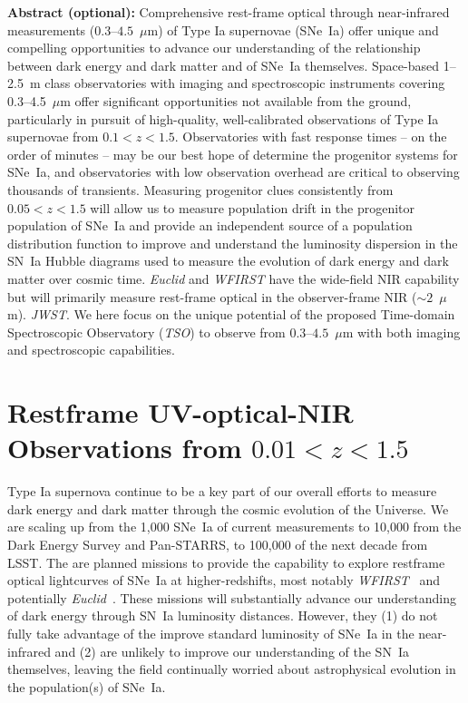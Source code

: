 \documentclass[12pt,preprint]{aastex}
\newcommand{\snia}{SN~Ia\xspace}
\newcommand{\sneia}{SNe~Ia\xspace}
\begin{document}
\textbf{Abstract  (optional):}
    Comprehensive rest-frame optical through near-infrared measurements ($0.3$--$4.5$~$\mu$m) of Type Ia supernovae (\sneia) offer unique and compelling opportunities to advance our understanding of the relationship between dark energy and dark matter and of \sneia themselves.
    Space-based 1--2.5~m class observatories with imaging and spectroscopic instruments covering 0.3--4.5~$\mu$m offer significant opportunities not available from the ground, particularly in pursuit of high-quality, well-calibrated observations of Type Ia supernovae from $0.1<z<1.5$.  Observatories with fast response times -- on the order of minutes -- may be our best hope of determine the progenitor systems for \sneia, and observatories with low observation overhead are critical to observing thousands of transients.  Measuring progenitor clues consistently from $0.05<z<1.5$ will allow us to measure population drift in the progenitor population of \sneia and provide an independent source of a population distribution function to improve and understand the luminosity dispersion in the \snia Hubble diagrams used to measure the evolution of dark energy and dark matter over cosmic time.  {\it Euclid} and {\it WFIRST} have the wide-field NIR capability but will primarily measure rest-frame optical in the observer-frame NIR ($\sim2$~$\mu$m). {\it JWST}.  We here focus on the unique potential of the proposed Time-domain Spectroscopic Observatory ({\it TSO}) to observe from $0.3$--$4.5$~$\mu$m with both imaging and spectroscopic capabilities.


\pagebreak

\section{Restframe UV-optical-NIR Observations from $0.01<z<1.5$}

Type Ia supernova continue to be a key part of our overall efforts to measure dark energy and dark matter through the cosmic evolution of the Universe.  We are scaling up from the 1,000 \sneia of current measurements to 10,000 from the Dark Energy Survey and Pan-STARRS, to 100,000 of the next decade from LSST.  The are planned missions to provide the capability to explore restframe optical lightcurves of \sneia at higher-redshifts, most notably {\it WFIRST}~\citep{Spergel15,Hounsell18} and potentially {\it Euclid}~\citep{Astier14}.  These missions will substantially advance our understanding of dark energy through \snia luminosity distances.  However, they (1) do not fully take advantage of the improve standard luminosity of \sneia in the near-infrared and (2) are unlikely to improve our understanding of the \snia themselves, leaving the field continually worried about astrophysical evolution in the population(s) of \sneia.
\end{document}
